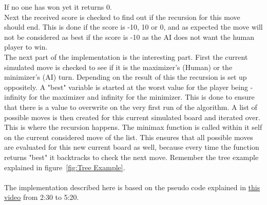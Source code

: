 If no one has won yet it returns 0.\\
Next the received score is checked to find out if the recursion for this move should end. This is done if the score is -10, 10 or 0, 
and as expected the move will not be considered as best 
if the score is -10 as the AI does not want the human player to win.\\
The next part of the implementation is the interesting part. First the current simulated move is checked to see if it is the maximizer's (Human) or the minimizer's (AI) turn. 
Depending on the result of this the recursion is set up oppositely. A "best" variable is started at the worst value for the player being 
-infinity for the maximizer and infinity for the minimizer. This is done to ensure that there is a value to overwrite on the very first run of the algorithm.
A list of possible moves is then created for this current simulated board and iterated over. This is where the recursion happens.
The minimax function is called within it self on the current considered move of the list. This ensures that all possible moves are evaluated for this new current board as well, 
because every time the function returns "best" it backtracks to check the next move. Remember the tree example explained in figure~\ref{fig:Tree Example}.\\\\
The implementation described here is based on the pseudo code explained in \href{https://www.youtube.com/watch?v=l-hh51ncgDI}{this video} from 2:30 to 5:20.
\clearpage